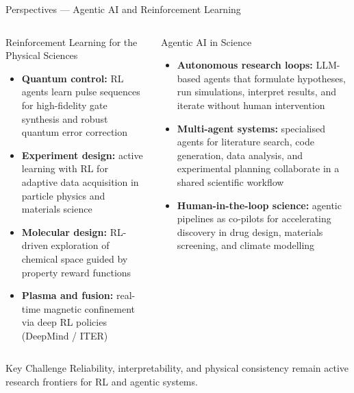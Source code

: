 \documentclass[aspectratio=169,11pt]{beamer}
\begin{document}
\begin{frame}{Perspectives --- Agentic AI and Reinforcement Learning}
  \begin{columns}[T]
      \begin{block}{Reinforcement Learning for the Physical Sciences}
        \begin{itemize}\itemsep2pt
          \item \textbf{Quantum control:}
                RL agents learn pulse sequences for
                high-fidelity gate synthesis and
                robust quantum error correction
          \item \textbf{Experiment design:}
                active learning with RL for
                adaptive data acquisition in
                particle physics and materials science
          \item \textbf{Molecular design:}
                RL-driven exploration of chemical
                space guided by property reward
                functions
          \item \textbf{Plasma and fusion:}
                real-time magnetic confinement
                via deep RL policies
                (DeepMind / ITER)
        \end{itemize}
      \end{block}
      \begin{block}{Agentic AI in Science}
        \begin{itemize}\itemsep2pt
          \item \textbf{Autonomous research loops:}
                LLM-based agents that formulate
                hypotheses, run simulations, interpret
                results, and iterate without
                human intervention
          \item \textbf{Multi-agent systems:}
                specialised agents for literature
                search, code generation, data
                analysis, and experimental
                planning collaborate in a shared
                scientific workflow
          \item \textbf{Human-in-the-loop science:}
                agentic pipelines as co-pilots
                for accelerating discovery
                in drug design, materials screening,
                and climate modelling
        \end{itemize}
      \end{block}
  \end{columns}
  \vspace{3pt}
  \begin{alertblock}{Key Challenge}
    Reliability, interpretability, and physical consistency
    remain active research frontiers for RL and agentic systems.
  \end{alertblock}
\end{frame}
\end{document}
